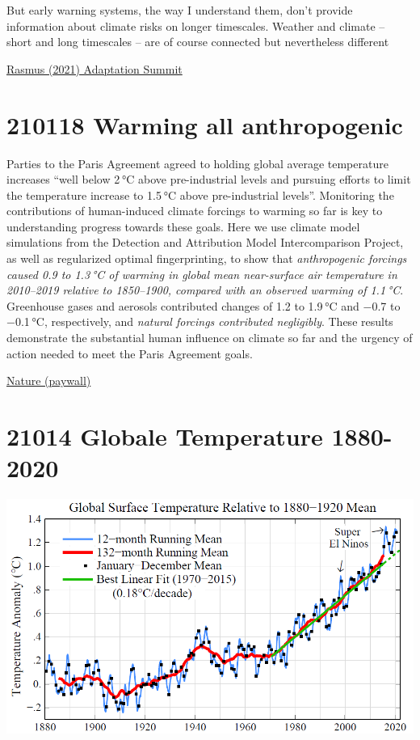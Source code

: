 \documentclass[
]{book}
\begin{document}
But early warning systems, the way I understand them, don't provide information about climate risks on longer timescales. Weather and climate -- short and long timescales -- are of course connected but nevertheless different

\href{http://www.realclimate.org/index.php/archives/2021/01/climate-adaptation-summit-2021/}{Rasmus (2021) Adaptation Summit}

\hypertarget{warming-all-anthropogenic}{%
\section{210118 Warming all anthropogenic}\label{warming-all-anthropogenic}}

Parties to the Paris Agreement agreed to holding global average temperature increases ``well below 2 °C above pre-industrial levels and pursuing efforts to limit the temperature increase to 1.5 °C above pre-industrial levels''. Monitoring the contributions of human-induced climate forcings to warming so far is key to understanding progress towards these goals. Here we use climate model simulations from the Detection and Attribution Model Intercomparison Project, as well as regularized optimal fingerprinting, to show that \emph{anthropogenic forcings caused 0.9 to 1.3 °C of warming in global mean near-surface air temperature in 2010--2019 relative to 1850--1900, compared with an observed warming of 1.1 °C}. Greenhouse gases and aerosols contributed changes of 1.2 to 1.9 °C and −0.7 to −0.1 °C, respectively, and \emph{natural forcings contributed negligibly}. These results demonstrate the substantial human influence on climate so far and the urgency of action needed to meet the Paris Agreement goals.

\href{https://www.nature.com/articles/s41558-020-00965-9}{Nature (paywall)}

\hypertarget{globale-temperature-1880-2020}{%
\section{21014 Globale Temperature 1880-2020}\label{globale-temperature-1880-2020}}

\includegraphics{fig/Global_Temperature_1880-2020.png}
\end{document}
